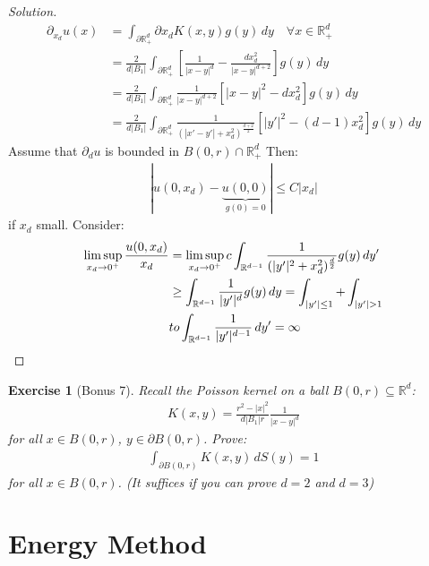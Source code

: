 \documentclass{report}
\theoremstyle{tommy}
\newtheorem{ex}[defn]{Exercise}
\begin{document}
  \begin{proof}[Solution]
    \begin{align*}
      \partial_{x_d} u(x) &= \int_{\partial \mathbb{R}_+^d} \partial x_d K(x,y) g(y) \, dy \quad \forall x \in \mathbb{R}_+^d \\
      &= \frac{2}{d |B_1|} \int_{\partial \mathbb{R}_+^d} \left[\frac{1}{|x-y|^d} - \frac{dx_d^2}{|x-y|^{d+2}}\right] g(y) \, dy \\
      &= \frac{2}{d |B_1|} \int_{\partial \mathbb{R}_+^d} \frac{1}{|x-y|^{d+2}} [|x-y|^2 - dx_d^2] g(y) \, dy \\
      &= \frac{2}{d|B_1|} \int_{\partial \mathbb{R}_+^d} \frac{1}{(|x'-y'|+x_d^2)^{\frac{d+2}{2}}} \left[|y'|^2 - (d-1) x_d^2\right] g(y) \, dy
    \end{align*}
    Assume that \(\partial_d u\) is bounded in \(B(0,r) \cap \mathbb{R}_+^d\) Then:
    \begin{align*}
      |u(0,x_d) - \underbrace{u(0,0)}_{g(0) = 0}| \le C |x_d|
    \end{align*}
    if \(x_d\) small. Consider:
    \begin{align*}
      \limsup_{x_d \to 0^+} \frac{u(0,x_d)}{x_d} 
      &= \limsup_{x_d \to 0^+} c \int_{\mathbb{R}^{d-1}} \frac{1}{(|y'|^2 + x_d^2)^{\frac{d}{2}}} g(y) \, dy' \\
      &\ge \int_{\mathbb{R}^{d-1}} \frac{1}{|y'|^d} g(y) \, dy 
      = \int_{|y'| \le 1} + \int_{|y'| > 1} \\
      &to \int_{\mathbb{R}^{d-1}} \frac{1}{|y'|^{d-1}} \, dy' = \infty \qedhere
    \end{align*}
  \end{proof}

  \begin{ex}[Bonus 7]
    Recall the Poisson kernel on a ball \(B(0,r) \subseteq \mathbb{R}^d\):
    \begin{align*}
      K(x,y) = \frac{r^2 - |x|^2}{d|B_1|r} \frac{1}{|x-y|^d}
    \end{align*}
    for all \(x \in B(0,r)\), \(y \in \partial B(0,r)\). Prove:
    \begin{align*}
      \int_{\partial B(0,r)} K(x,y) \, dS(y) = 1
    \end{align*}
    for all \(x \in B(0,r)\). (It suffices if you can prove \(d = 2\) and \(d = 3\))
  \end{ex}

  \section{Energy Method}
\end{document}
